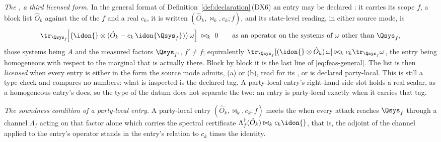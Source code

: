 \begin{definition}
\emph{The , a third licensed form.} In the general format of
Definition~\ref{def:declaration}\,(DX6) an entry may be declared
:
it carries its scope $f$, a block list $\hat O_k$ against the
 of the  $f$ and a real $c_k$, it is
written
$(\hat O_k,\bowtie_k,c_k;f)$, and its state-level reading, in either source
mode, is
\begin{equation}\label{eq:partylocal-entry}
  \tr_{\Qsys_f}\!\Big[\big(\idon{}\otimes
  (\hat O_k-c_k\,\idon{\Qsys_f})\big)\,\omega\Big]\;\bowtie_k\;0
  \qquad\text{as an operator on the systems of }\omega
  \text{ other than }\Qsys_f ,
\end{equation}
those systems being $A$ and the measured factors $\Qsys_{f'}$, $f'\ne f$;
equivalently $\tr_{\Qsys_f}[(\idon{}\otimes\hat O_k)\,\omega]\bowtie_k
c_k\tr_{\Qsys_f}\omega$, the entry being homogeneous with respect to the
marginal that is actually there. Block by block it is the last line of
\eqref{eq:feas-general}. The list is then \emph{licensed} when every entry
is either in the form the source mode admits, (a) or (b), read for its
, or is declared party-local. This is still a type
check and compares no numbers: what is inspected is the declared tag. A
party-local entry's right-hand-side slot holds a real scalar, as a
homogeneous entry's does, so the type of the datum does not separate the
two: an entry is party-local exactly when it carries that tag.

\emph{The soundness condition of a party-local entry.} A party-local entry
$(\hat O_k,\bowtie_k,c_k;f)$ meets the
when every attack reaches $\Qsys_f$ through a channel $\Lambda_f$ acting on
that factor alone which carries the spectral certificate
$\Lambda_f^{\dagger}(\hat O_k)\bowtie_kc_k\idon{}$, that is, the adjoint of
the channel applied to the entry's operator stands in the entry's relation to
$c_k$ times the identity.


\end{definition}
